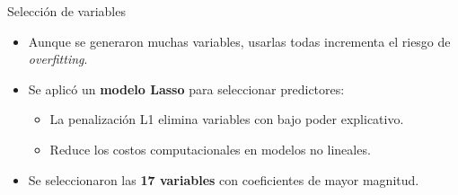 \documentclass[10pt]{beamer}
\begin{document}
\begin{frame}{Selección de variables}
\begin{itemize}
    \item Aunque se generaron muchas variables, usarlas todas incrementa el riesgo de \textit{overfitting}.
    \item Se aplicó un \textbf{modelo Lasso} para seleccionar predictores:
    \begin{itemize}
        \item La penalización L1 elimina variables con bajo poder explicativo.
        \item Reduce los costos computacionales en modelos no lineales.
    \end{itemize}
    \item Se seleccionaron las \textbf{17 variables} con coeficientes de mayor magnitud.
\end{itemize}
\end{frame}
\end{document}
